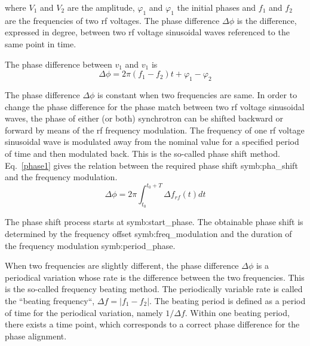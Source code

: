 where $V_1$ and $V_2$ are the amplitude, $\varphi_1$ and $\varphi_1$ the initial phases and $f_1$ and $f_2$ are the frequencies of two rf voltages. The phase difference $\Delta \phi$ is the difference, expressed in degree, between two rf voltage sinusoidal waves referenced to the same point in time. 


The phase difference between $v_1$ and $v_1$ is
\begin{equation}
	\Delta \phi=2\pi(f_1-f_2)t+\varphi_1-\varphi_2\label{phase_diff_general}
\end{equation}

The phase difference $\Delta \phi$ is constant when two frequencies are same. In order to change the phase difference for the phase match between two rf voltage sinusoidal waves, the phase of either (or both) synchrotron can be shifted backward or forward by means of the rf frequency modulation. The frequency of one rf voltage sinusoidal wave is modulated away from the nominal value for a specified period of time and then modulated back. This is the so-called phase shift method. Eq.~\ref{phase1} gives the relation between the required phase shift \gls{symb:pha_shift} and the frequency modulation. 
\begin{equation}
\Delta \phi= 2\pi \int_{t_0}^{t_0+T} \Delta f_{rf}(t)dt \label{phase1}
\end{equation}

The phase shift process starts at \gls{symb:start_phase}. The obtainable phase shift is determined by the frequency offset \gls{symb:freq_modulation} and the duration of the frequency modulation \gls{symb:period_phase}. 

When two frequencies are slightly different, the phase difference $\Delta \phi$ is a periodical variation whose rate is the difference between the two frequencies. This is the so-called frequency beating method. The periodically variable rate is called the ``beating frequency``, $\Delta f=|f_1-f_2|$. The beating period is defined as a period of time for the periodical variation, namely $1/\Delta f$. Within one beating period, there exists a time point, which corresponds to a correct phase difference for the phase alignment. 

